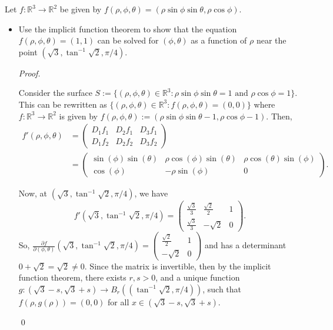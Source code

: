\documentclass[12pt]{article}
\newenvironment{problem}[2][Problem]{\begin{trivlist}
\item[\hskip \labelsep {\bfseries #1}\hskip \labelsep {\bfseries #2.}]}{\end{trivlist}}
\newenvironment{sol}
    {\emph{Proof.}
    }
    {
    \qed
    }
\begin{document}
\begin{problem}{23}
Let $f : \mathbb{R}^3 \to \mathbb{R}^2$ be given by $f(\rho, \phi, \theta) = (\rho\sin\phi\sin\theta,\rho\cos\phi)$.

\begin{itemize}
    \item[(a)] Use the implicit function theorem to show that the equation $f(\rho,\phi,\theta) = (1,1)$ can be solved for $(\phi,\theta)$ as a function of $\rho$ near the point $(\sqrt{3},\tan^{-1}\sqrt{2}, \pi/4)$.
    
    \begin{sol}
    Consider the surface $S := \{(\rho, \phi, \theta) \in \mathbb{R}^3 : \rho\sin\phi\sin\theta = 1 \text{ and } \rho\cos\phi = 1\}$. This can be rewritten as $\{(\rho, \phi, \theta) \in \mathbb{R}^3 : f(\rho, \phi, \theta) = (0,0)\}$ where $f : \mathbb{R}^3 \to \mathbb{R}^2$ is given by $f(\rho, \phi, \theta) := (\rho\sin\phi\sin\theta - 1,\rho\cos\phi - 1)$.
    Then, \begin{align*}
        f'(\rho, \phi, \theta) &= \begin{pmatrix}
D_1f_1 & D_2f_1 & D_3f_1 \\ 
D_1f_2 & D_2f_2 & D_3f_2
\end{pmatrix} \\ &= \begin{pmatrix}
\sin\left(\phi\right) \sin\left(\theta\right) & \rho \cos\left(\phi\right) \sin\left(\theta\right) & \rho \cos\left(\theta\right) \sin\left(\phi\right) \\ 
\cos\left(\phi\right) & -\rho \sin\left(\phi\right) & 0
\end{pmatrix}.
    \end{align*}
    
    Now, at $(\sqrt{3},\tan^{-1}\sqrt{2}, \pi/4)$, we have $$f'(\sqrt{3},\tan^{-1}\sqrt{2}, \pi/4) = \begin{pmatrix}
\frac{\sqrt{3}}{3} & \frac{\sqrt{2}}{2} & 1 \\ 
\frac{\sqrt{3}}{3} & -\sqrt{2} & 0
\end{pmatrix}.$$ So, $\frac{\partial f}{\partial (\phi, \theta)}(\sqrt{3},\tan^{-1}\sqrt{2}, \pi/4) = \begin{pmatrix}
\frac{\sqrt{2}}{2} & 1 \\ 
-\sqrt{2} & 0
\end{pmatrix}$ and has a determinant $0+\sqrt{2} = \sqrt{2} \neq 0$. Since the matrix is invertible, then by the implicit function theorem, there exists $r,s > 0$, and a unique function $g : (\sqrt{3}-s,\sqrt{3}+s) \to B_r\left((\tan^{-1}\sqrt{2},\pi/4)\right)$, such that $f(\rho,g(\rho)) = (0,0)$ for all $x \in (\sqrt{3}-s,\sqrt{3}+s)$.
    \end{sol}
    

\end{itemize}
\end{problem}
\end{document}
